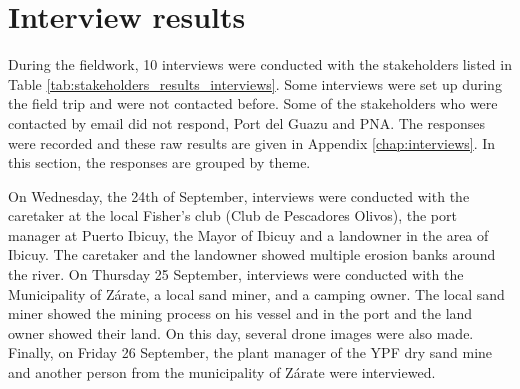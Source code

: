 \section{Interview results}
\label{sect:interviewresults}

During the fieldwork, 10 interviews were conducted with the stakeholders listed in Table \ref{tab:stakeholders_results_interviews}. Some interviews were set up during the field trip and were not contacted before. Some of the stakeholders who were contacted by email did not respond, Port del Guazu and PNA. The responses were recorded and these raw results are given in Appendix \ref{chap:interviews}. In this section, the responses are grouped by theme.

On Wednesday, the 24th of September, interviews were conducted with the caretaker at the local Fisher's club (Club de Pescadores Olivos), the port manager at Puerto Ibicuy, the Mayor of Ibicuy and a landowner in the area of Ibicuy. The caretaker and the landowner showed multiple erosion banks around the river. On Thursday 25 September, interviews were conducted with the Municipality of Zárate, a local sand miner, and a camping owner. The local sand miner showed the mining process on his vessel and in the port and the land owner showed their land. On this day, several drone images were also made. Finally, on Friday 26 September, the plant manager of the YPF dry sand mine and another person from the municipality of Zárate were interviewed. 

